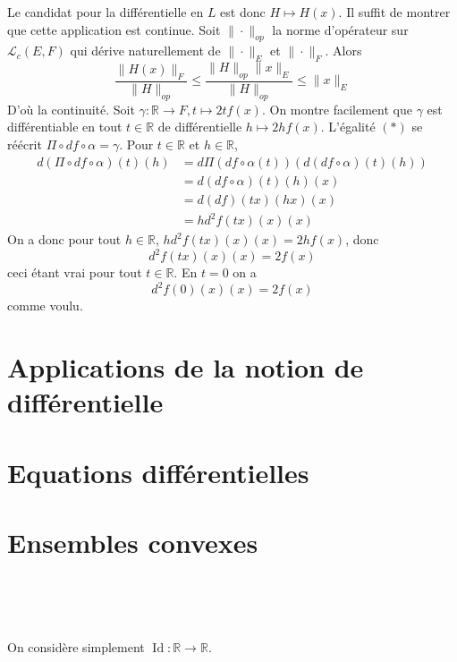\documentclass{report}
\DeclareMathOperator{\Id}{Id}
\begin{document}
Le candidat pour la différentielle en $L$ est donc $H\mapsto H(x)$. Il suffit de montrer que cette application est continue.\newline
Soit $\|\cdot\|_{op}$ la norme d'opérateur sur $\mathcal L_c(E,F)$ qui dérive naturellement de $\|\cdot\|_E$ et $\|\cdot\|_F$.\newline
Alors $$ \frac{\|H(x)\|_F}{\|H\|_{op}}\leq \frac{\|H\|_{op}\|x\|_E}{\|H\|_{op}}\leq\|x\|_E $$
D'où la continuité. \newline \newline
Soit $\gamma: \mathbb R\to F, t\mapsto 2tf(x)$. On montre facilement que $\gamma$ est différentiable en tout $t\in \mathbb R$ de différentielle $h\mapsto 2hf(x)$.\newline
L'égalité $(*)$ se réécrit $\Pi\circ df \circ \alpha = \gamma$. Pour $t\in \mathbb R$ et $h\in \mathbb R$, $$\begin{aligned}
d(\Pi\circ df \circ \alpha)(t)(h) &= d\Pi(df\circ \alpha(t))(d(df\circ \alpha)(t)(h)) \\
&= d(df\circ \alpha)(t)(h)(x)\\
&= d(df)(tx)(hx)(x)\\
&= hd^2f(tx)(x)(x)
\end{aligned}$$
On a donc pour tout $h\in \mathbb R$, $hd^2f(tx)(x)(x) = 2hf(x)$, donc $$d^2f(tx)(x)(x) = 2f(x)$$ ceci étant vrai pour tout $t\in \mathbb R$.
En $t=0$ on a $$d^2f(0)(x)(x) = 2f(x)$$ comme voulu.

\section{Applications de la notion de différentielle}

\section{Equations différentielles}

\section{Ensembles convexes}

\subsection{} \noindent{}\\ 
\\ 
\\
\noindent On considère simplement $\Id:\mathbb R \to \mathbb R$.
\end{document}

